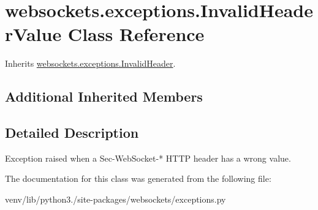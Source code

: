\hypertarget{classwebsockets_1_1exceptions_1_1_invalid_header_value}{}\section{websockets.\+exceptions.\+Invalid\+Header\+Value Class Reference}
\label{classwebsockets_1_1exceptions_1_1_invalid_header_value}


Inherits \hyperlink{classwebsockets_1_1exceptions_1_1_invalid_header}{websockets.\+exceptions.\+Invalid\+Header}.

\subsection*{Additional Inherited Members}


\subsection{Detailed Description}
\begin{DoxyVerb}Exception raised when a Sec-WebSocket-* HTTP header has a wrong value.\end{DoxyVerb}
 

The documentation for this class was generated from the following file\+:\begin{DoxyCompactItemize}
\item 
venv/lib/python3./site-\/packages/websockets/exceptions.\+py\end{DoxyCompactItemize}
